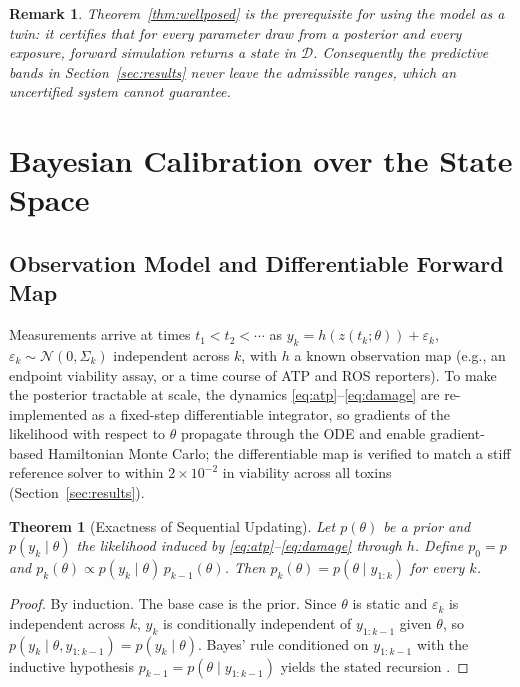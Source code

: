 \documentclass[journal]{IEEEtran}
\newtheorem{theorem}{Theorem}
\newtheorem{remark}{Remark}
\begin{document}
\begin{remark}
Theorem~\ref{thm:wellposed} is the prerequisite for using the model as a twin: it
certifies that for \emph{every} parameter draw from a posterior and \emph{every}
exposure, forward simulation returns a state in $\mathcal{D}$. Consequently the
predictive bands in Section~\ref{sec:results} never leave the admissible ranges,
which an uncertified system cannot guarantee.
\end{remark}

\section{Bayesian Calibration over the State Space}
\label{sec:inference}

\subsection{Observation Model and Differentiable Forward Map}

Measurements arrive at times $t_1<t_2<\cdots$ as
$y_k=h(z(t_k;\theta))+\varepsilon_k$, $\varepsilon_k\sim\mathcal{N}(0,\Sigma_k)$
independent across $k$, with $h$ a known observation map (e.g., an endpoint
viability assay, or a time course of ATP and ROS reporters). To make the
posterior tractable at scale, the dynamics \eqref{eq:atp}--\eqref{eq:damage} are
re-implemented as a fixed-step differentiable integrator, so gradients of the
likelihood with respect to $\theta$ propagate through the ODE and enable
gradient-based Hamiltonian Monte Carlo; the differentiable map is verified to
match a stiff reference solver to within $2\times10^{-2}$ in viability across all
toxins (Section~\ref{sec:results}).

\begin{theorem}[Exactness of Sequential Updating]
\label{thm:filter}
Let $p(\theta)$ be a prior and $p(y_k\mid\theta)$ the likelihood induced by
\eqref{eq:atp}--\eqref{eq:damage} through $h$. Define $p_0=p$ and
$p_k(\theta)\propto p(y_k\mid\theta)\,p_{k-1}(\theta)$. Then
$p_k(\theta)=p(\theta\mid y_{1:k})$ for every $k$.
\end{theorem}
\begin{proof}
By induction. The base case is the prior. Since $\theta$ is static and
$\varepsilon_k$ is independent across $k$, $y_k$ is conditionally independent of
$y_{1:k-1}$ given $\theta$, so $p(y_k\mid\theta,y_{1:k-1})=p(y_k\mid\theta)$.
Bayes' rule conditioned on $y_{1:k-1}$ with the inductive hypothesis
$p_{k-1}=p(\theta\mid y_{1:k-1})$ yields the stated recursion \cite{sarkka2013}.
\end{proof}
\end{document}

